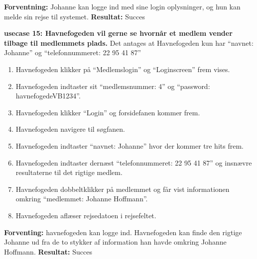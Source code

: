 \textbf{Forventning:} Johanne kan logge ind med sine login oplysninger, og hun kan melde sin rejse til systemet.
\textbf{Resultat:} Succes


\textbf{usecase 15: Havnefogeden vil gerne se hvornår et medlem vender tilbage til medlemmets plads.}
Det antages at Havnefogeden kun har \enquote{navnet: Johanne} og \enquote{telefonnummeret: 22 95 41 87}
\begin{enumerate}
	\item Havnefogeden klikker på \enquote{Medlemslogin} og \enquote{Loginscreen} frem vises.
	\item Havnefogeden indtaster sit \enquote{medlemsnummer: 4} og \enquote{password: havnefogedeVB1234}.
	\item Havnefogeden klikker \enquote{Login} og forsidefanen kommer frem.
	\item Havnefogeden navigere til søgfanen.
	\item Havnefogeden indtaster \enquote{navnet: Johanne} hvor der kommer tre hits frem.
	\item Havnefogeden indtaster dernæst \enquote{telefonnummeret: 22 95 41 87} og insnævre resultaterne til det rigtige medlem.
	\item Havnefogeden dobbeltklikker på medlemmet og får vist informationen omkring \enquote{medlemmet: Johanne Hoffmann}.
	\item Havnefogeden aflæser rejsedatoen i rejsefeltet.
\end{enumerate} 

\textbf{Forventing:} havnefogeden kan logge ind. Havnefogeden kan finde den rigtige Johanne ud fra de to stykker af information han havde omkring Johanne Hoffmann.
\textbf{Resultat:} Succes


